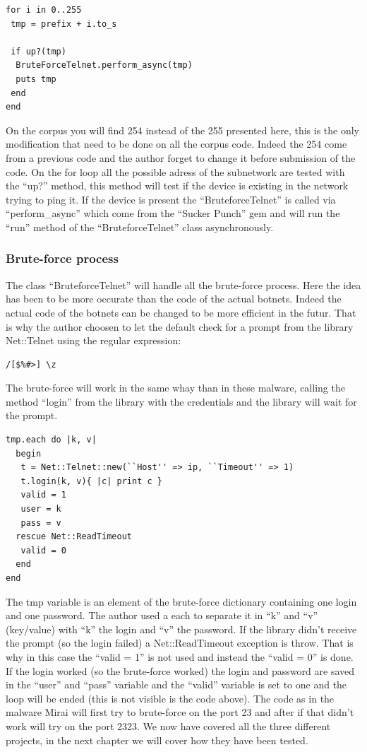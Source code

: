 \documentclass{report}
\begin{document}
\lstset{language=Ruby}
\begin{lstlisting}[frame=single]
for i in 0..255
 tmp = prefix + i.to_s

 if up?(tmp)
  BruteForceTelnet.perform_async(tmp)
  puts tmp
 end
end
\end{lstlisting}
On the corpus you will find 254 instead of the 255 presented here, this is the only modification that need to be done on all the corpus code. Indeed the 254 come from a previous code and the author forget to change it before submission of the code.\newline
On the for loop all the possible adress of the subnetwork are tested with the ``up?'' method, this method will test if the device is existing in the network trying to ping it. If the device is present the ``BruteforceTelnet'' is called via ``perform\_async'' which come from the ``Sucker Punch'' \autocite{suckerpunch} gem and will run the ``run'' method of the ``BruteforceTelnet'' class asynchronously.

\subsubsection{Brute-force process}
The class ``BruteforceTelnet'' will handle all the brute-force process. Here the idea has been to be more occurate than the code of the actual botnets. Indeed the actual code of the botnets can be changed to be more efficient in the futur. That is why the author choosen to let the default check for a prompt from the library Net::Telnet \autocite{nettelnet} using the regular expression:
\begin{Verbatim}[frame=single]
/[$%#>] \z
\end{Verbatim}
The brute-force will work in the same whay than in these malware, calling the method ``login'' from the library with the credentials and the library will wait for the prompt.
\lstset{language=Ruby}
\begin{lstlisting}[frame=single]
tmp.each do |k, v|
  begin
   t = Net::Telnet::new(``Host'' => ip, ``Timeout'' => 1)
   t.login(k, v){ |c| print c }
   valid = 1
   user = k
   pass = v
  rescue Net::ReadTimeout
   valid = 0
  end
end
\end{lstlisting}
The tmp variable is an element of the brute-force dictionary containing one login and one password. The author used a each to separate it in ``k'' and ``v'' (key/value) with ``k'' the login and ``v'' the password. If the library didn't receive the prompt (so the login failed) a Net::ReadTimeout exception is throw. That is why in this case the ``valid = 1'' is not used and instead the ``valid = 0'' is done. If the login worked (so the brute-force worked) the login and password are saved in the ``user'' and ``pass'' variable and the ``valid'' variable is set to one and the loop will be ended (this is not visible is the code above).\newline
The code as in the malware Mirai will first try to brute-force on the port 23 and after if that didn't work will try on the port 2323.\newline
\newline
We now have covered all the three different projects, in the next chapter we will cover how they have been tested.
\end{document}
